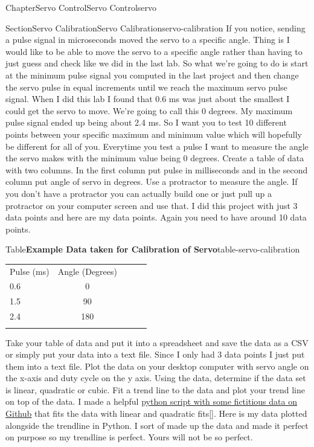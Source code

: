 \documentclass[oneside,10pt,]{book}
\newcommand{\tabularfont}{\relax}
\newcommand{\xreffont}{\relax}
\newcommand{\linkhilite}[1]{\underline{#1}}
\numberwithin{equation}{section}
\newcommand{\hrulethin}  {\noalign{\hrule height 0.04em}}
\begin{document}
\begin{chapterptx}{Chapter}{Servo Control}{}{Servo Control}{}{}{servo}
\begin{sectionptx}{Section}{Servo Calibration}{}{Servo Calibration}{}{}{servo-calibration}
If you notice, sending a pulse signal in microseconds moved the servo to a specific angle. Thing is I would like to be able to move the servo to a specific angle rather than having to just guess and check like we did in the last lab. So what we're going to do is start at the minimum pulse signal you computed in the last project and then change the servo pulse in equal increments until we reach the maximum servo pulse signal. When I did this lab I found that 0.6 ms was just about the smallest I could get the servo to move. We're going to call this 0 degrees. My maximum pulse signal ended up being about 2.4 ms. So I want you to test 10 different points between your specific maximum and minimum value which will hopefully be different for all of you. Everytime you test a pulse I want to measure the angle the servo makes with the minimum value being 0 degrees. Create a table of data with two columns. In the first column put pulse in milliseconds and in the second column put angle of servo in degrees. Use a protractor to measure the angle. If you don't have a protractor you can actually build one or just pull up a protractor on your computer screen and use that. I did this project with just 3 data points and here are my data points. Again you need to have around 10 data points.%
\begin{tableptx}{Table}{\textbf{Example Data taken for Calibration of Servo}}{table-servo-calibration}{}%
\centering%
{\tabularfont%
\begin{tabular}{AcAcA}\hrulethin
Pulse (ms)&Angle (Degrees)\tabularnewline\hrulethin
0.6&0\tabularnewline\hrulethin
1.5&90\tabularnewline\hrulethin
2.4&180\tabularnewline\hrulethin
\end{tabular}
}%
\end{tableptx}%
Take your table of data and put it into a spreadsheet and save the data as a CSV or simply put your data into a text file. Since I only had 3 data points I just put them into a text file. Plot the data on your desktop computer with servo angle on the x-axis and duty cycle on the y axis. Using the data, determine if the data set is linear, quadratic or cubic. Fit a trend line to the data and plot your trend line on top of the data. I made a helpful \href{https://github.com/cmontalvo251/Python/blob/master/instrumentation/least_squares_regression.py}{\linkhilite{python script with some fictitious data on Github}} that fits the data with linear and quadratic fits\hyperlink{Github}{\linkhilite{[{\xreffont 33}]}}. Here is my data plotted alongside the trendline in Python. I sort of made up the data and made it perfect on purpose so my trendline is perfect. Yours will not be so perfect.%

\end{sectionptx}
\end{chapterptx}
\end{document}
